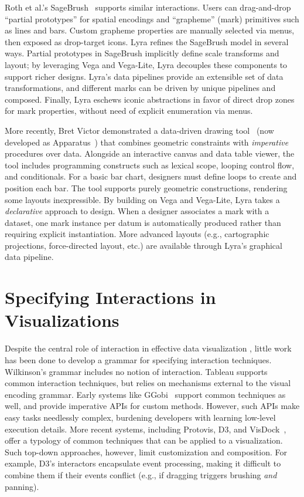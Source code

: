 Roth et al.'s SageBrush~\cite{roth:sagebrush} supports similar interactions.
Users can drag-and-drop ``partial prototypes'' for spatial encodings and
``grapheme'' (mark) primitives such as lines and bars. Custom grapheme
properties are manually selected via menus, then exposed as drop-target icons.
Lyra refines the SageBrush model in several ways. Partial prototypes in
SageBrush implicitly define scale transforms and layout; by leveraging Vega and
Vega-Lite, Lyra decouples these components to support richer designs. Lyra's
data pipelines provide an extensible set of data transformations, and different
marks can be driven by unique pipelines and composed. Finally, Lyra eschews
iconic abstractions in favor of direct drop zones for mark properties, without
need of explicit enumeration via menus.

More recently, Bret Victor demonstrated a data-driven drawing
tool~\cite{victor:drawing} (now developed as Apparatus~\cite{apparatus}) that
combines geometric constraints with \emph{imperative} procedures over data.
Alongside an interactive canvas and data table viewer, the tool includes
programming constructs such as lexical scope, looping control flow, and
conditionals. For a basic bar chart, designers must define loops to create and
position each bar. The tool supports purely geometric constructions, rendering
some layouts inexpressible. By building on Vega and Vega-Lite, Lyra takes a
\emph{declarative} approach to design. When a designer associates a mark with a
dataset, one mark instance per datum is automatically produced rather than
requiring explicit instantiation. More advanced layouts (e.g., cartographic
projections, force-directed layout, etc.) are available through Lyra's graphical
data pipeline.

\vspace{-10pt}

\section{Specifying Interactions in Visualizations}

\vspace{-10pt}

Despite the central role of interaction in effective data visualization
\cite{heer:dynamics, pike:interactionscience}, little work has been done to
develop a grammar for specifying interaction techniques. Wilkinson's grammar
includes no notion of interaction. Tableau supports common interaction
techniques, but relies on mechanisms external to the visual encoding grammar.
Early systems like GGobi~\cite{swayne:ggobi} support common techniques as well,
and provide imperative APIs for custom methods. However, such APIs make easy
tasks needlessly complex, burdening developers with learning low-level execution
details. More recent systems, including Protovis, D3, and
VisDock~\cite{choi:visdock}, offer a typology of common techniques that can be
applied to a visualization. Such top-down approaches, however, limit
customization and composition. For example, D3's interactors encapsulate event
processing, making it difficult to combine them if their events conflict (e.g.,
if dragging triggers brushing \emph{and} panning).

